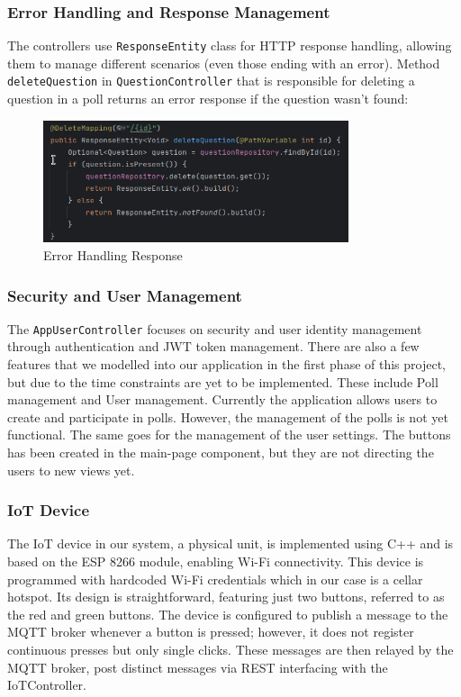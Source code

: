 \subsubsection{Error Handling and Response Management}
The controllers use \texttt{ResponseEntity} class for HTTP response handling, allowing them to manage different scenarios (even those ending with an error).  Method \texttt{deleteQuestion} in \texttt{QuestionController} that is responsible for deleting a question in a poll returns an error response if the question wasn't found:

\begin{figure}[h]
  \centering
  \includegraphics[width=0.80\textwidth]{figs/delete_mapping.png}
  \caption{Error Handling Response}
  \label{fig:my_label}
\end{figure}


\subsubsection{Security and User Management}
The \texttt{AppUserController} focuses on security and user identity management through authentication and JWT token management.  There are also a few features that we modelled into our application in the first phase of this project,
but due to the time constraints are yet to be implemented. These include Poll management and User
management. Currently the application allows users to create and participate in polls. However, the
management of the polls is not yet functional. The same goes for the management of the user
settings. The buttons has been created in the main-page component, but they are not directing the
users to new views yet.

\subsubsection{IoT Device}
The IoT device in our system, a physical unit, is implemented using C++ and is based on the ESP 8266 module, enabling Wi-Fi connectivity. This device is programmed with hardcoded Wi-Fi credentials which in our case is a cellar hotspot. Its design is straightforward, featuring just two buttons, referred to as the red and green buttons. The device is configured to publish a message to the MQTT broker whenever a button is pressed; however, it does not register continuous presses but only single clicks. These messages are then relayed by the MQTT broker, post distinct messages via REST interfacing with the IoTController.


